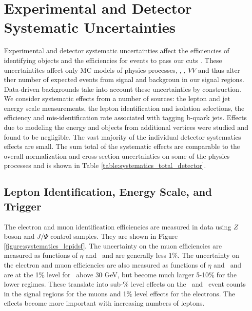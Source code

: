\section{Experimental and Detector Systematic Uncertainties}
 
Experimental and detector systematic uncertainties affect the efficiencies of identifying objects and the efficiencies for events to pass our cuts . These uncertaintites affect only MC models of physics processes, \ttV, \tth, $VV$ and thus alter ther number of expected events from signal and backgroun in our signal regions. Data-driven backgrounds take into account these uncertainties by construction. We consider systematic effects from a number of sources: the lepton and jet energy scale measurements, the lepton identification and isolation selections, the efficiency and mis-identification rate associated with tagging b-quark jets. Effects due to modeling the energy and objects from additional vertices were studied and found to be negligible. The vast majority of the individual detector systematics effects are small. The sum total of the systematic effects are comparable to the overall normalization and cross-section uncertainties on some of the physics processes and is shown in Table \ref{table:systematics_total_detector}.

\subsection{Lepton Identification, Energy Scale, and Trigger}
The electron\cite{ATLAS-CONF-2014-032} and muon identification efficiencies\cite{MuonSF} are measured in data using $Z$ boson and $J/\Psi$ control samples. They are shown in Figure \ref{figure:systematics_lepidsf}. The uncertainty on the muon efficiencies are measured as functions of $\eta$ and \pt\ and are generally less 1\%. The uncertainty on the electron and muon efficiencies are also measured as functions of $\eta$ and \pt\ and are at the 1\% level for \pt\ above 30 GeV, but become much larger 5-10\% for the lower \pt regimes.   These translate into sub-\% level effects on the \ttV\ and \tth\ event counts in the signal regions for the muons and 1\% level effects for the electrons. The effects become more important with increasing numbers of leptons.  

